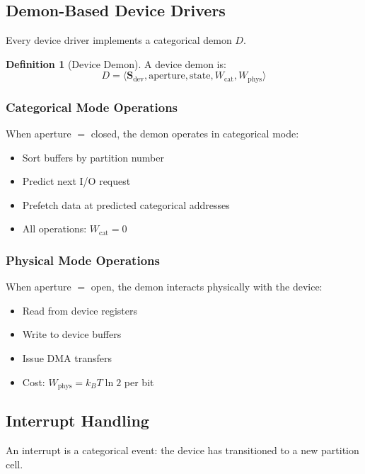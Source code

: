 \documentclass[twocolumn,10pt]{article}
\theoremstyle{definition}
\newtheorem{definition}[theorem]{Definition}
\theoremstyle{remark}
\newcommand{\Scoord}{\mathbf{S}}
\begin{document}
\subsection{Demon-Based Device Drivers}

Every device driver implements a categorical demon $D$.

\begin{definition}[Device Demon]
A device demon is:
\begin{equation}
    D = \langle \Scoord_{\text{dev}}, \text{aperture}, \text{state}, W_{\text{cat}}, W_{\text{phys}} \rangle
\end{equation}
\end{definition}

\subsubsection{Categorical Mode Operations}

When aperture $= $ closed, the demon operates in categorical mode:
\begin{itemize}
    \item Sort buffers by partition number
    \item Predict next I/O request
    \item Prefetch data at predicted categorical addresses
    \item All operations: $W_{\text{cat}} = 0$
\end{itemize}

\subsubsection{Physical Mode Operations}

When aperture $= $ open, the demon interacts physically with the device:
\begin{itemize}
    \item Read from device registers
    \item Write to device buffers
    \item Issue DMA transfers
    \item Cost: $W_{\text{phys}} = k_B T \ln 2$ per bit
\end{itemize}

\subsection{Interrupt Handling}

An interrupt is a categorical event: the device has transitioned to a new partition cell.
\end{document}
